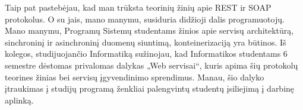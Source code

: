 Taip pat pastebėjau, kad man trūksta teorinių žinių apie REST ir SOAP protokolus. O su jais, mano manymu, susiduria didžioji dalis programuotojų.
Mano manymu, Programų Sistemų studentams žinios apie servisų architektūrą, sinchroninį ir asinchroninį duomenų siuntimą, konteinerizaciją yra būtinos.
Iš kolegos, studijuojančio Informatiką sužinojau, kad Informatikos studentams 6 semestre dėstomas privalomas dalykas „Web servisai“,
kuris apima šių protokolų teorines žinias bei servisų įgyvendinimo sprendimus. Manau, šio dalyko įtraukimas į studijų programą ženkliai palengvintų studentų įsiliejimą į darbinę aplinką.
